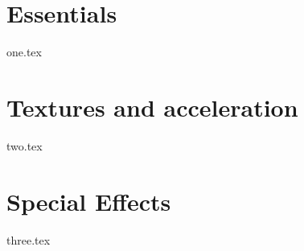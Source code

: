 

\addto\captionsenglish{\renewcommand{\chaptername}{Milestone}}



 
\tableofcontents
\setcounter{page}{0}

\chapter{Essentials}
{one.tex}

\chapter{Textures and acceleration}
{two.tex}

\chapter{Special Effects}
{three.tex}

